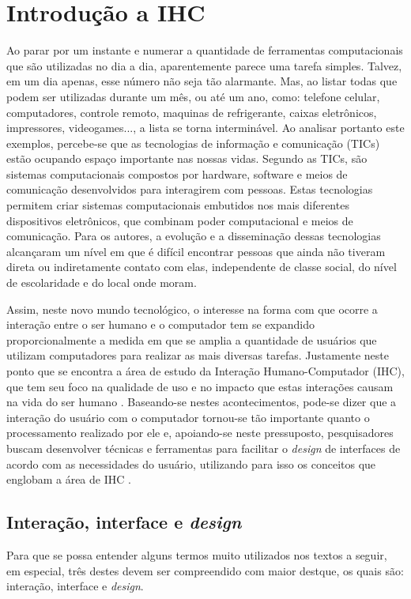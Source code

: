 \chapter{Introdução a IHC}
Ao parar por um instante e numerar a quantidade de ferramentas computacionais que são utilizadas no dia a dia, aparentemente parece uma tarefa simples. Talvez, em um dia apenas, esse número não seja tão alarmante. Mas, ao listar todas que podem ser utilizadas durante um mês, ou até um ano, como: telefone celular, computadores, controle remoto, maquinas de refrigerante, caixas eletrônicos, impressores, videogames..., a lista se torna interminável. Ao analisar portanto este exemplos, percebe-se que as tecnologias de informação e comunicação (TICs) estão ocupando espaço importante nas nossas vidas. Segundo  as TICs, são sistemas computacionais compostos por hardware, software e meios de comunicação desenvolvidos para interagirem com pessoas. Estas tecnologias permitem criar sistemas computacionais embutidos nos mais diferentes dispositivos eletrônicos, que combinam poder computacional e meios de comunicação. Para os autores, a evolução e a disseminação dessas tecnologias alcançaram um nível em que é difícil encontrar pessoas que ainda não tiveram direta ou indiretamente contato com elas, independente de classe social, do nível de escolaridade e do local onde moram.

Assim, neste novo mundo tecnológico, o interesse na forma com que ocorre a interação entre o ser humano e o computador tem se expandido proporcionalmente a medida em que se amplia a quantidade de usuários que utilizam computadores para realizar as mais diversas tarefas. Justamente neste ponto que se encontra a área de estudo da Interação Humano-Computador (IHC), que tem seu foco na qualidade de uso e no impacto que estas interações causam na vida do ser humano \cite{barbosa2010IHC}. Baseando-se nestes acontecimentos, pode-se dizer que a interação do usuário com o computador tornou-se tão importante quanto o processamento realizado por ele e, apoiando-se neste pressuposto, pesquisadores buscam desenvolver técnicas e ferramentas para facilitar o \textit{design} de interfaces de acordo com as necessidades do usuário, utilizando para isso os conceitos que englobam a área de IHC \cite{barbosa2010IHC}.

\section{Interação, interface e \textit{design}} \label{section:interacao-e-interface-e-design}
Para que se possa entender alguns termos muito utilizados nos textos a seguir, em especial, três destes devem ser compreendido com maior destque, os quais são: interação, interface e \textit{design}.

